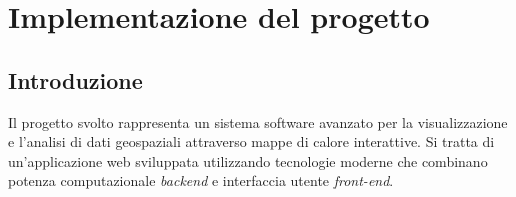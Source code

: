 \chapter{Implementazione del progetto}
\label{ch:implementazione}

\section{Introduzione}

Il progetto svolto rappresenta un sistema software avanzato per la visualizzazione
e l'analisi di dati geospaziali attraverso mappe di calore interattive. Si
tratta di un'applicazione web sviluppata utilizzando tecnologie moderne che
combinano potenza computazionale \textit{backend} e interfaccia utente \textit{front-end}.



\newpage



\newpage


